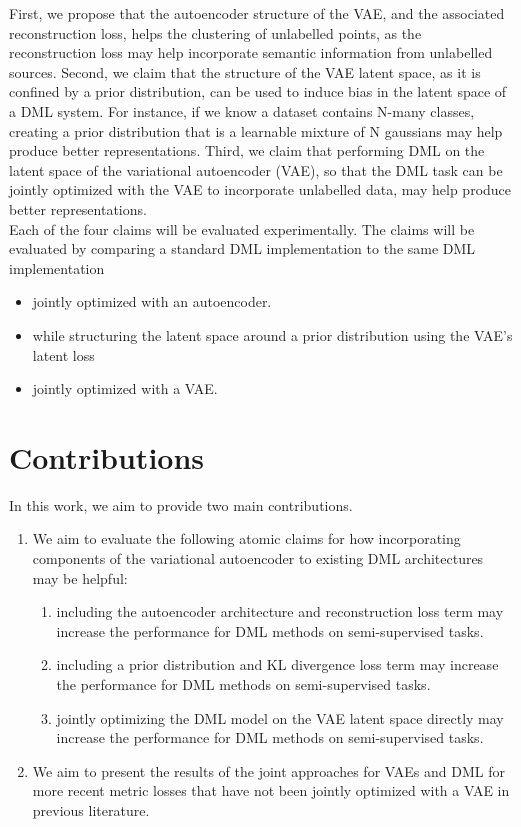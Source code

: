 \documentclass[./dissertation.tex]{subfiles}
\begin{document}
    First, we propose that the autoencoder structure of the VAE, and the associated reconstruction loss, helps the clustering of unlabelled points, as the reconstruction loss may help incorporate semantic information from unlabelled sources. Second, we claim that the structure of the VAE latent space, as it is confined by a prior distribution, can be used to induce bias in the latent space of a DML system. For instance, if we know a dataset contains N-many classes, creating a prior distribution that is a learnable mixture of N gaussians may help produce better representations. Third, we claim that performing DML on the latent space of the variational autoencoder (VAE), so that the DML task can be jointly optimized with the VAE to incorporate unlabelled data, may help produce better representations. \\
    
    Each of the four claims will be evaluated experimentally. The claims will be evaluated by comparing a standard DML implementation to the same DML implementation
    \begin{itemize}
        \item jointly optimized with an autoencoder.
        \item while structuring the latent space around a prior distribution using the VAE’s latent loss
        \item jointly optimized with a VAE. 
    \end{itemize}

    \section{Contributions}
    In this work, we aim to provide two main contributions. 
    \begin{enumerate}
        \item We aim to evaluate the following atomic claims for how incorporating components of the variational autoencoder to existing DML architectures may be helpful:
        \begin{enumerate}
            \item including the autoencoder architecture and reconstruction loss term may increase the performance for DML methods on semi-supervised tasks.
            \item including a prior distribution and KL divergence loss term may increase the performance for DML methods on semi-supervised tasks.
            \item jointly optimizing the DML model on the VAE latent space directly may increase the performance for DML methods on semi-supervised tasks.
        \end{enumerate}
        \item We aim to present the results of the joint approaches for VAEs and DML for more recent metric losses that have not been jointly optimized with a VAE in previous literature. 
    \end{enumerate}
\end{document}
